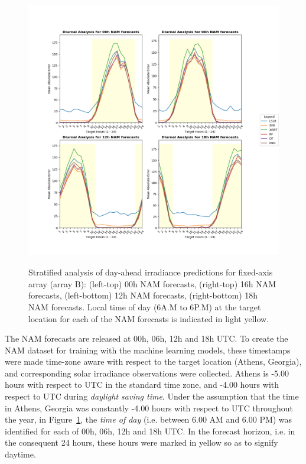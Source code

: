 \begin{figure}[ht]
    \begin{center}
    	\includegraphics[width=\textwidth, height=12cm]{chapter3/fig_diurnal_arrayb.png}
    	\caption[Stratified diurnal analysis of day-ahead irradiance predictions for fixed-axis array]{Stratified analysis of day-ahead irradiance predictions for fixed-axis array (array B): (left-top) 00h NAM forecasts, (right-top) 16h NAM forecasts, (left-bottom) 12h NAM forecasts, (right-bottom) 18h NAM forecasts. Local time of day (6A.M to 6P.M) at the target location for each of the NAM forecasts is indicated in light yellow.}
    	\label{fig:fig_stratified_diurnal}
    \end{center}
\end{figure}

\par The NAM forecasts are released at 00h, 06h, 12h and 18h UTC. To create the NAM dataset for training with the machine learning models, these timestamps were made time-zone aware with respect to the target location (Athens, Georgia), and corresponding solar irradiance observations were collected. Athens is -5.00 hours with respect to UTC in the standard time zone, and -4.00 hours with respect to UTC during \textit{daylight saving time}. Under the assumption that the time in Athens, Georgia was constantly -4.00 hours with respect to UTC throughout the year, in Figure~\ref{fig:fig_stratified_diurnal}, the \textit{time of day} (i.e. between 6.00 AM and 6.00 PM) was identified for each of 00h, 06h, 12h and 18h UTC. In the forecast horizon, i.e. in the consequent 24 hours, these hours were marked in yellow so as to signify daytime. 

